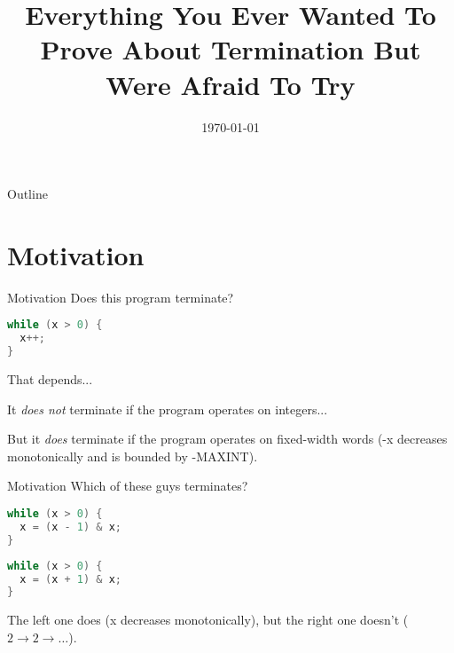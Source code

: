 \documentclass[xcolor=pdftex,t,11pt]{beamer}
\title{Everything You Ever Wanted To Prove About Termination But Were Afraid To Try}
\date{\today}
\begin{document}

\begin{frame}[plain]
  \titlepage
\end{frame}

\begin{frame}{Outline}
  \tableofcontents
\end{frame}

\section{Motivation}


\begin{frame}[fragile]{Motivation}
Does this program terminate?
\begin{center}
\begin{minipage}{0.4\linewidth}
 \begin{lstlisting}[language=C,basicstyle=\normalsize]
while (x > 0) {
  x++;
}
 \end{lstlisting}
\end{minipage}
\end{center}

\pause

That depends...

It \emph{does not} terminate if the program operates on integers...

But it \emph{does} terminate if the program operates on fixed-width words
(-x decreases monotonically and is bounded by -MAXINT).

\end{frame}

\begin{frame}[fragile]{Motivation}
Which of these guys terminates?
\begin{center}
\begin{minipage}{0.45\linewidth}
 \begin{lstlisting}[language=C,basicstyle=\normalsize]
while (x > 0) {
  x = (x - 1) & x;
}
\end{lstlisting}
\end{minipage}
\begin{minipage}{0.45\linewidth}
 \begin{lstlisting}[language=C,basicstyle=\normalsize]
while (x > 0) {
  x = (x + 1) & x;
}
\end{lstlisting}
\end{minipage}
\end{center}

\pause

The left one does (x decreases monotonically), but the right one doesn't ($2 \rightarrow 2 \rightarrow \dots$).
\end{frame}
\end{document}
